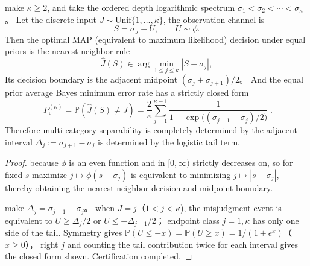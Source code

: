 

\begin{proposition}\label{prop:xi-logistic-multiclass-map-error}
make \(\kappa\ge 2\), and take the ordered depth logarithmic spectrum
\(
\sigma_1<\sigma_2<\cdots<\sigma_\kappa
\)。
Let the discrete input \(J\sim\mathrm{Unif}\{1,\dots,\kappa\}\), the observation channel is
\[
S=\sigma_J+U,
\qquad
U\sim\phi.
\]
Then the optimal MAP (equivalent to maximum likelihood) decision under equal priors is the nearest neighbor rule
\[
\widehat J(S)\in\arg\min_{1\le j\le\kappa}|S-\sigma_j|,
\]
Its decision boundary is the adjacent midpoint \((\sigma_j+\sigma_{j+1})/2\)。
And the equal prior average Bayes minimum error rate has a strictly closed form
\[
\boxed{\;
P_{\mathrm e}^{(\kappa)}
=\mathbb P(\widehat J(S)\neq J)
=\frac{2}{\kappa}\sum_{j=1}^{\kappa-1}\frac{1}{1+\exp\!\bigl((\sigma_{j+1}-\sigma_j)/2\bigr)}\; }.
\]
Therefore multi-category separability is completely determined by the adjacent interval \(\Delta_j:=\sigma_{j+1}-\sigma_j\) is determined by the logistic tail term.
\end{proposition}
\begin{proof}
because \(\phi\) is an even function and in \([0,\infty)\) strictly decreases on, so for fixed \(s\) maximize \(j\mapsto \phi(s-\sigma_j)\) is equivalent to minimizing \(j\mapsto |s-\sigma_j|\), thereby obtaining the nearest neighbor decision and midpoint boundary.
\par
make \(\Delta_j=\sigma_{j+1}-\sigma_j\)。
when \(J=j\)（\(1<j<\kappa\)), the misjudgment event is equivalent to
\(
U\ge \Delta_j/2
\)
or
\(
U\le -\Delta_{j-1}/2
\)；
endpoint class \(j=1,\kappa\) has only one side of the tail.
Symmetry gives
\(
\mathbb P(U\le -x)=\mathbb P(U\ge x)=1/(1+e^{x})
\)（\(x\ge 0\)），
right \(j\) and counting the tail contribution twice for each interval gives the closed form shown. Certification completed.
\end{proof}


